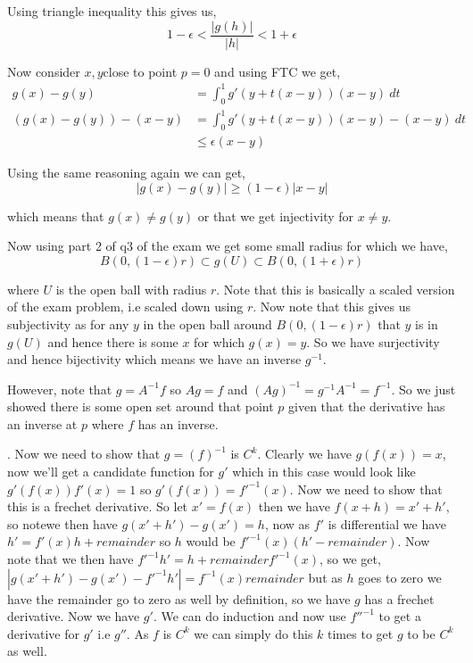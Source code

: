 \documentclass[a4paper]{article}
\begin{document}
Using triangle inequality this gives us, 
\[
  1 - \epsilon < \frac{|g(h)|}{|h|} < 1 + \epsilon
\]

Now consider $x,y $close to point $p = 0$ and using FTC we get, 
\begin{align*}
  g(x) - g(y) &= \int_{0}^{1}  g'(y + t(x - y))(x  - y) \ dt\\
  (g(x) - g(y)) - (x - y)&= \int_{0}^{1}  g'(y + t(x - y))(x  - y) - (x - y) \ dt\\
                         &\le  \epsilon (x - y)
\end{align*}

Using the same reasoning again we can get, 
\[
  |g(x) - g(y)| \ge (1 - \epsilon)|x- y|
\]

which means that $g(x) \ne g(y)$ or that we get injectivity for $x \ne y$.
\vspace{1em}

Now using part 2 of q3 of the exam we get some small radius for which we have, 
\[
  B(0, (1 - \epsilon)r) \subset g(U) \subset B(0, (1 + \epsilon)r)
\]


where $U$ is the open ball with radius $r$. Note that this is basically a scaled version of the exam problem, i.e scaled down using $r$. Now note that this gives us subjectivity as for any $y$ in the open ball around $B(0, (1 - \epsilon) r)$ that $y$ is in $g(U)$ and hence there is some $x$ for which $g(x) = y$. So we have surjectivity and hence bijectivity which means we have an inverse $g^{-1}$. 

\vspace{1em}

However, note that $g = A^{-1}f$ so $A g = f$ and $(Ag)^{-1} = g^{-1}A^{-1} = f^{-1}$. So we just showed there is some open set around that point $p$ given that the derivative has an inverse at $p$ where $f$ has an inverse.

\vspace{1em}

. Now we need to show that $g = \left ( f\right )^{-1}$ is $C^{k}$. Clearly we  have $g(f(x)) = x$, now we'll get a candidate function for $g'$ which in this case would look like $g'(f(x)) f'(x) = 1$ so $g'(f(x)) = f'^{-1}(x)$. Now we need to show that this is a frechet derivative. So let $x' = f(x)$ then we have $f(x + h) = x' + h'$, so notewe then have $g(x' + h') - g(x') = h$, now as $f'$ is  differential we have $h' = f'(x) h + remainder$ so $h$ would be $f'^{-1}(x)(h' - remainder)$. Now note that we then have $f'^{-1}h' = h + remainder f'^{-1}(x)$, so we get, $|g(x' + h') - g(x') - f'^{-1}h'| = f^{-1}(x)remainder$ but as $h$ goes to zero we have the remainder go to zero as well by definition, so we have $g$ has a frechet derivative. Now we have $g'$. We can do induction and now use $f''^{-1}$ to get a derivative for $g'$ i.e $g''$. As $f$  is $C^{k}$ we can simply do this $k$ times to get $g$ to be $C^{k}$ as well.
\end{document}
